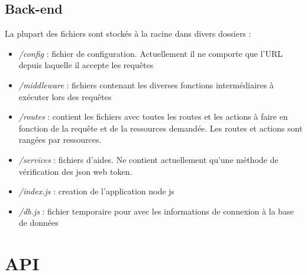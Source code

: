 \documentclass[english,12pt,a4paper]{report}
\begin{document}
\section{Back-end}
La plupart des fichiers sont stockés à la racine dans divers dossiers :
\begin{itemize}
	\item \textit{/config} : fichier de configuration. Actuellement il ne comporte que l'URL depuis laquelle il accepte les requêtes
	\item \textit{/middleware} : fichiers contenant les diverses fonctions intermédiaires à exécuter lors des requêtes
	\item \textit{/routes} : contient les fichiers avec toutes les routes et les actions à faire en fonction de la requête et de la ressources demandée. Les routes et actions sont rangées par ressources.
	\item \textit{/services} : fichiers d'aides. Ne contient actuellement qu'une méthode de vérification des json web token.
	\item \textit{/index.js} : creation de l'application node js
	\item \textit{/db.js} : fichier temporaire pour avec les informations de connexion à la base de données
\end{itemize}

\chapter{API}


\end{document}
